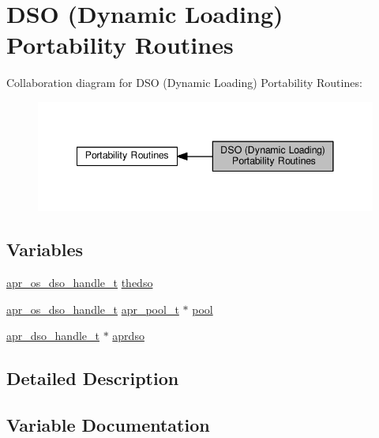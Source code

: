 \hypertarget{group__apr__os__dso}{}\section{D\+SO (Dynamic Loading) Portability Routines}
\label{group__apr__os__dso}
Collaboration diagram for D\+SO (Dynamic Loading) Portability Routines\+:
\nopagebreak
\begin{figure}[H]
\begin{center}
\leavevmode
\includegraphics[width=341pt]{group__apr__os__dso}
\end{center}
\end{figure}
\subsection*{Variables}
\begin{DoxyCompactItemize}
\item 
\hyperlink{group__apr__portabile_ga542684803ee8ab0abd69077697599ec0}{apr\+\_\+os\+\_\+dso\+\_\+handle\+\_\+t} \hyperlink{group__apr__os__dso_ga9d76f5d6111b4eb897b86fc2505090a0}{thedso}
\item 
\hyperlink{group__apr__portabile_ga542684803ee8ab0abd69077697599ec0}{apr\+\_\+os\+\_\+dso\+\_\+handle\+\_\+t} \hyperlink{structapr__pool__t}{apr\+\_\+pool\+\_\+t} $\ast$ \hyperlink{group__apr__os__dso_gabf492bb70124e5ce4d3c5264627c3208}{pool}
\item 
\hyperlink{structapr__dso__handle__t}{apr\+\_\+dso\+\_\+handle\+\_\+t} $\ast$ \hyperlink{group__apr__os__dso_gad5e2aa064daa809b06b485d3382e7869}{aprdso}
\end{DoxyCompactItemize}


\subsection{Detailed Description}


\subsection{Variable Documentation}
